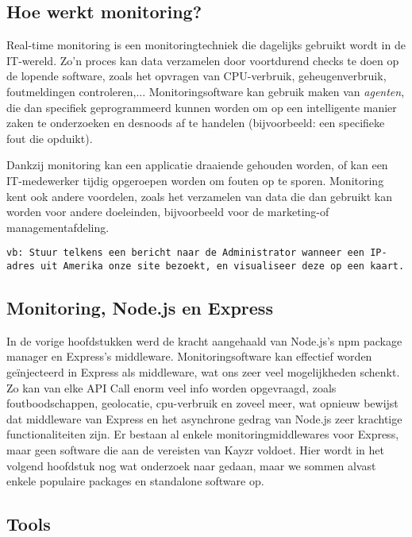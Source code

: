 \subsection{Hoe werkt monitoring?}
\label{sec:howMonitoringWorks}

Real-time monitoring is een monitoringtechniek die dagelijks gebruikt wordt in de IT-wereld. Zo'n proces kan data verzamelen door voortdurend checks te doen op de lopende software, zoals het opvragen van CPU-verbruik, geheugenverbruik, foutmeldingen controleren,... Monitoringsoftware kan gebruik maken van \textit{agenten}, die dan specifiek geprogrammeerd kunnen worden om op een intelligente manier zaken te onderzoeken en desnoods af te handelen (bijvoorbeeld: een specifieke fout die opduikt).

Dankzij monitoring kan een applicatie draaiende gehouden worden, of kan een IT-medewerker tijdig opgeroepen worden om fouten op te sporen. Monitoring kent ook andere voordelen, zoals het verzamelen van data die dan gebruikt kan worden voor andere doeleinden, bijvoorbeeld voor de marketing-of managementafdeling. 

\texttt{vb: Stuur telkens een bericht naar de Administrator wanneer een IP-adres uit Amerika onze site bezoekt, en visualiseer deze op een kaart.}

\subsection{Monitoring, Node.js en Express}
\label{sec:monitoringNodeExpress}

In de vorige hoofdstukken werd de kracht aangehaald van Node.js's npm package manager en Express's middleware. Monitoringsoftware kan effectief worden geïnjecteerd in Express als middleware, wat ons zeer veel mogelijkheden schenkt. Zo kan van elke API Call enorm veel info worden opgevraagd, zoals foutboodschappen, geolocatie, cpu-verbruik en zoveel meer, wat opnieuw bewijst dat middleware van Express en het asynchrone gedrag van Node.js zeer krachtige functionaliteiten zijn. Er bestaan al enkele monitoringmiddlewares voor Express, maar geen software die aan de vereisten van Kayzr voldoet. Hier wordt in het volgend hoofdstuk nog wat onderzoek naar gedaan, maar we sommen alvast enkele populaire packages en standalone software op.

\subsection{Tools}
\label{sec:tools}

